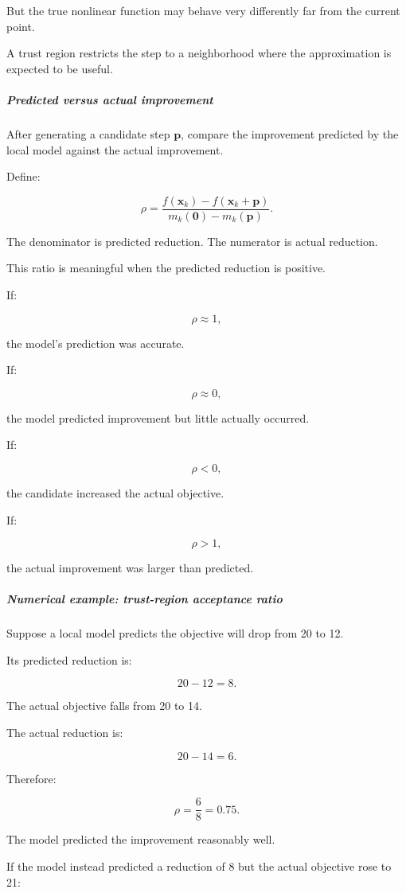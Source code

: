 But the true nonlinear function may behave very differently far from the current point.

A trust region restricts the step to a neighborhood where the approximation is expected to be useful.

\subparagraph{Predicted versus actual improvement}\label{predicted-versus-actual-improvement}

After generating a candidate step \(\mathbf p\), compare the improvement predicted by the local model against the actual improvement.

Define:

\[
\boxed{ \rho= \frac{ f(\mathbf x_k)-f(\mathbf x_k+\mathbf p) }{ m_k(\mathbf 0)-m_k(\mathbf p) } }.
\]

The denominator is predicted reduction. The numerator is actual reduction.

This ratio is meaningful when the predicted reduction is positive.

If:

\[
\rho\approx1,
\]

the model's prediction was accurate.

If:

\[
\rho\approx0,
\]

the model predicted improvement but little actually occurred.

If:

\[
\rho<0,
\]

the candidate increased the actual objective.

If:

\[
\rho>1,
\]

the actual improvement was larger than predicted.

\subparagraph{Numerical example: trust-region acceptance ratio}\label{numerical-example-trust-region-acceptance-ratio}

Suppose a local model predicts the objective will drop from 20 to 12.

Its predicted reduction is:

\[
20-12=8.
\]

The actual objective falls from 20 to 14.

The actual reduction is:

\[
20-14=6.
\]

Therefore:

\[
\rho=\frac68=\boxed{0.75}.
\]

The model predicted the improvement reasonably well.

If the model instead predicted a reduction of 8 but the actual objective rose to 21:

